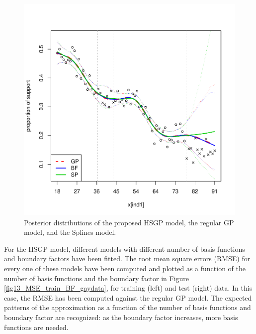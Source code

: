\documentclass[]{interact}
\theoremstyle{plain}%
\theoremstyle{definition}
\theoremstyle{remark}
\begin{document}
\begin{figure}[H]
\centering
\includegraphics[scale=0.50]{fig12_Posteriors_gaydata.pdf}
\caption{Posterior distributions of the proposed HSGP model, the regular GP model, and the Splines model.}
  \label{fig12_Posteriors_gaydata}
\end{figure}

For the HSGP model, different models with different number of basis functions and boundary factors have been fitted. The root mean square errors (RMSE) for every one of these models have been computed and plotted as a function of the number of basis functions and the boundary factor in Figure \ref{fig13_MSE_train_BF_gaydata}, for training (left) and test (right) data. In this case, the RMSE has been computed against the regular GP model. The expected patterns of the approximation as a function of the number of basis functions and boundary factor are recognized: as the boundary factor increases, more basis functions are needed.
\end{document}
